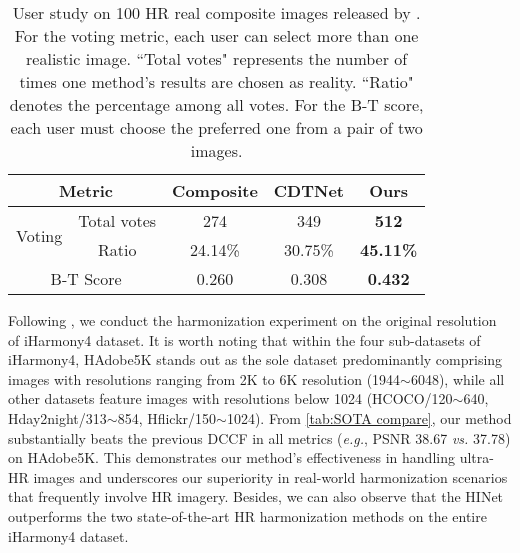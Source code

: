 \documentclass[10pt,journal,twocolumn,twoside]{IEEEtran}
\begin{document}
\begin{table}[!t]
\caption{User study on 100 HR real composite images released by \cite{cong2022high}. For the voting metric, each user can select more than one realistic image. ``Total votes" represents the number of times one method's results are chosen as reality. ``Ratio" denotes the percentage among all votes. For the B-T score, each user must choose the preferred one from a pair of two images. }
    \label{tab:User HR}
    \renewcommand{\arraystretch}{1.2} 
    \centering
\begin{tabular}{c|c|ccc}
\hline
\multicolumn{2}{c|}{Metric}     & Composite & CDTNet\cite{cong2022high}  & Ours             \\ \hline
\multirow{2}{*}{Voting}& Total votes & 274       & 349     & \textbf{512}     \\
&Ratio       & 24.14\%   & 30.75\% & \textbf{45.11\%} \\ \hline
\multicolumn{2}{c|}{B-T Score} & 0.260 & 0.308 & \textbf{0.432}  \\ \hline
\end{tabular}
    
\end{table}


Following \cite{xue2022dccf, ke2022harmonizer}, we conduct the harmonization experiment on the original resolution of iHarmony4 dataset. It is worth noting that within the four sub-datasets of iHarmony4, HAdobe5K stands out as the sole dataset predominantly comprising images with resolutions ranging from 2K to 6K resolution (1944$\sim$6048), while all other datasets feature images with resolutions below 1024 (HCOCO/120$\sim$640, Hday2night/313$\sim$854, Hflickr/150$\sim$1024). From \cref{tab:SOTA compare}, our method substantially beats the previous DCCF in all metrics (\textit{e.g.}, PSNR 38.67 \textit{vs.} 37.78) on HAdobe5K. This demonstrates our method's effectiveness in handling ultra-HR images and underscores our superiority in real-world harmonization scenarios that frequently involve HR imagery. Besides, we can also observe that the HINet outperforms the two state-of-the-art HR harmonization methods on the entire iHarmony4 dataset.
\end{document}
